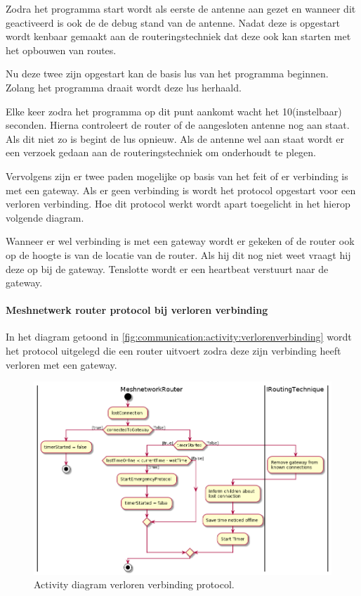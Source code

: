 \documentclass[a4paper, 11pt, oneside]{report}
\begin{document}
Zodra het programma start wordt als eerste de antenne aan gezet en wanneer dit geactiveerd is ook de de debug stand van de antenne. 
Nadat deze is opgestart wordt kenbaar gemaakt aan de routeringstechniek dat deze ook kan starten met het opbouwen van routes.

Nu deze twee zijn opgestart kan de basis lus van het programma beginnen. 
Zolang het programma draait wordt deze lus herhaald.

Elke  keer zodra het programma op dit punt aankomt wacht het 10(instelbaar) seconden.
Hierna controleert de router of de aangesloten antenne nog aan staat. 
Als dit niet zo is begint de lus opnieuw.
Als de antenne wel aan staat wordt er een verzoek gedaan aan de routeringstechniek om onderhoudt te plegen.

Vervolgens zijn er twee paden mogelijke op basis van het feit of er verbinding is met een gateway.
Als er geen verbinding is wordt het protocol opgestart voor een verloren verbinding.
Hoe dit protocol werkt wordt apart toegelicht in het hierop volgende diagram.

Wanneer er wel verbinding is met een gateway wordt er gekeken  of de router ook op de hoogte is van de locatie van de router.
Als hij dit nog niet weet vraagt hij deze op bij de gateway.
Tenslotte wordt er een heartbeat verstuurt naar de gateway.

\pagebreak
\paragraph{Meshnetwerk router protocol bij verloren verbinding}
\label{DetailedDesign:Communicatie:Activity:verloren}
In het diagram getoond in \autoref{fig:communication:activity:verlorenverbinding} wordt het protocol uitgelegd die een router uitvoert zodra deze zijn verbinding heeft verloren met een gateway.

\begin{figure}[H]
	\begin{center}\includegraphics[width=1\linewidth]{UML/out/Communication/activity/LostConnection/LostConnection.png}\end{center}
	\caption{Activity diagram verloren verbinding protocol.}
	\label{fig:communication:activity:verlorenverbinding}
\end{figure}
\end{document}
